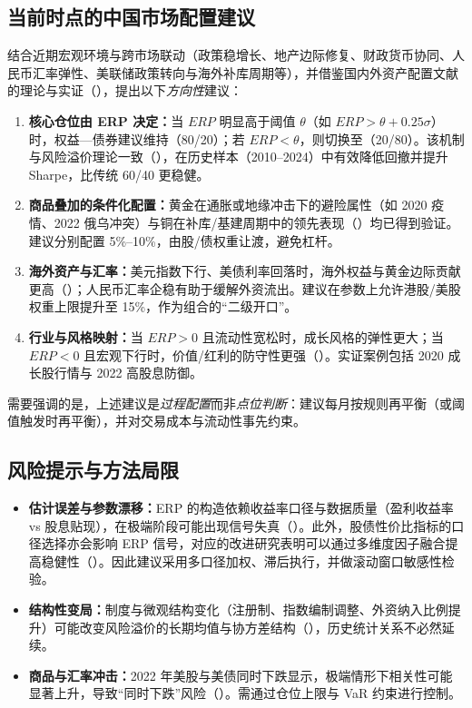 \documentclass[a4paper,12pt]{article}
\numberwithin{equation}{section}
\begin{document}
\subsection{当前时点的中国市场配置建议} \label{sec:policy}
结合近期宏观环境与跨市场联动（政策稳增长、地产边际修复、财政货币协同、人民币汇率弹性、美联储政策转向与海外补库周期等），并借鉴国内外资产配置文献的理论与实证（\cite{Markowitz1952,Sharpe1964,BlackLitterman1992,FamaFrench1989,FamaFrench1993,Cochrane2011,Ilmanen2011,Huafu2025,CSC2025_cycle}），提出以下\emph{方向性}建议：

\begin{enumerate}
  \item \textbf{核心仓位由 ERP 决定：}当 $ERP$ 明显高于阈值 $\theta$（如 $ERP>\theta+0.25\sigma$）时，权益—债券建议维持（80/20）；若 $ERP<\theta$，则切换至（20/80）。该机制与风险溢价理论一致（\cite{FamaFrench2002,Cochrane2011}），在历史样本（2010--2024）中有效降低回撤并提升 Sharpe，比传统 60/40 更稳健。
  \item \textbf{商品叠加的条件化配置：}黄金在通胀或地缘冲击下的避险属性（如 2020 疫情、2022 俄乌冲突）与铜在补库/基建周期中的领先表现（\cite{Moskowitz2012,Asness2013}）均已得到验证。建议分别配置 5\%--10\%，由股/债权重让渡，避免杠杆。
  \item \textbf{海外资产与汇率：}美元指数下行、美债利率回落时，海外权益与黄金边际贡献更高（\cite{Ang2009,Ilmanen2011}）；人民币汇率企稳有助于缓解外资流出。建议在参数上允许港股/美股权重上限提升至 15\%，作为组合的“二级开口”。
  \item \textbf{行业与风格映射：}当 $ERP>0$ 且流动性宽松时，成长风格的弹性更大；当 $ERP<0$ 且宏观下行时，价值/红利的防守性更强（\cite{FamaFrench1993,CSC2025_growthvalue}）。实证案例包括 2020 成长股行情与 2022 高股息防御。
\end{enumerate}

需要强调的是，上述建议是\emph{过程配置}而非\emph{点位判断}：建议每月按规则再平衡（或阈值触发时再平衡），并对交易成本与流动性事先约束。

\subsection{风险提示与方法局限} \label{sec:risk}
\begin{itemize}
  \item \textbf{估计误差与参数漂移：}ERP 的构造依赖收益率口径与数据质量（盈利收益率 vs 股息贴现），在极端阶段可能出现信号失真（\cite{Campbell2008,Gu2020}）。此外，股债性价比指标的口径选择亦会影响 ERP 信号，对应的改进研究表明可以通过多维度因子融合提高稳健性（\cite{Industrial2025_ratio}）。因此建议采用多口径加权、滞后执行，并做滚动窗口敏感性检验。
  \item \textbf{结构性变局：}制度与微观结构变化（注册制、指数编制调整、外资纳入比例提升）可能改变风险溢价的长期均值与协方差结构（\cite{Ibbotson2000,HT2024_global}），历史统计关系不必然延续。
  \item \textbf{商品与汇率冲击：}2022 年美股与美债同时下跌显示，极端情形下相关性可能显著上升，导致“同时下跌”风险（\cite{HT2024_odds,Industrial2025_ratio}）。需通过仓位上限与 VaR 约束进行控制。
\end{itemize}
\end{document}
